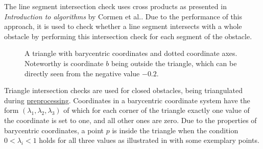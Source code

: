 			The line segment intersection check uses cross products as presented in \emph{Introduction to algorithms} by Cormen et al.\cite[1018]{cormen-introduction-to-alg}.
			Due to the performance of this approach, it is used to check whether a line segment intersects with a whole obstacle by performing this intersection check for each segment of the obstacle.
			
			\begin{figure}[h]
				\begin{figcenter}
				\end{figcenter}
				\caption[Example of a barycentric coordinate system.]{A triangle with barycentric coordinates and dotted coordinate axes. Noteworthy is coordinate $b$ being outside the triangle, which can be directly seen from the negative value $-0.2$.}
				\label{fig:barycentric-triangle}
			\end{figure}
			
			Triangle intersection checks are used for closed obstacles, being triangulated during \hyperref[subsec:step-1-preprocessing]{preprocessing}.
			Coordinates in a barycentric coordinate system have the form $(\lambda_1,\lambda_2,\lambda_3)$ of which for each corner of the triangle exactly one value of the coordinate is set to one, and all other ones are zero.
			Due to the properties of barycentric coordinates, a point $p$ is inside the triangle when the condition $0 < \lambda_i < 1$ holds for all three values as illustrated in  with some exemplary points.
			
